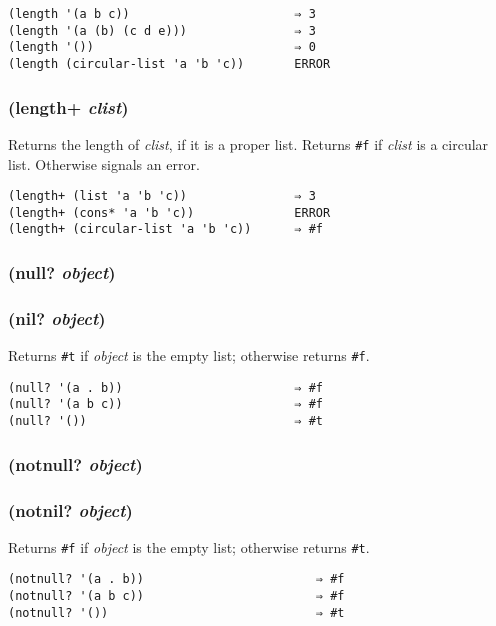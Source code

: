 \documentclass{article}
\begin{document}
\begin{verbatim}
(length '(a b c))                       ⇒ 3
(length '(a (b) (c d e)))               ⇒ 3
(length '())                            ⇒ 0
(length (circular-list 'a 'b 'c))       ERROR
\end{verbatim}

\subsubsection{(length+ \emph{clist})}

Returns the length of \emph{clist}, if it is a proper list. Returns \verb|#f| if
\emph{clist} is a circular list. Otherwise signals an error.

\begin{verbatim}
(length+ (list 'a 'b 'c))               ⇒ 3
(length+ (cons* 'a 'b 'c))              ERROR
(length+ (circular-list 'a 'b 'c))      ⇒ #f
\end{verbatim}

\subsubsection{(null? \emph{object})}

\subsubsection{(nil? \emph{object})}

Returns \verb|#t| if \emph{object} is the empty list; otherwise returns \verb|#f|.

\begin{verbatim}
(null? '(a . b))                        ⇒ #f
(null? '(a b c))                        ⇒ #f
(null? '())                             ⇒ #t
\end{verbatim}

\subsubsection{(notnull? \emph{object})}

\subsubsection{(notnil? \emph{object})}

Returns \verb|#f| if \emph{object} is the empty list; otherwise returns \verb|#t|.

\begin{verbatim}
(notnull? '(a . b))                        ⇒ #f
(notnull? '(a b c))                        ⇒ #f
(notnull? '())                             ⇒ #t
\end{verbatim}
\end{document}
